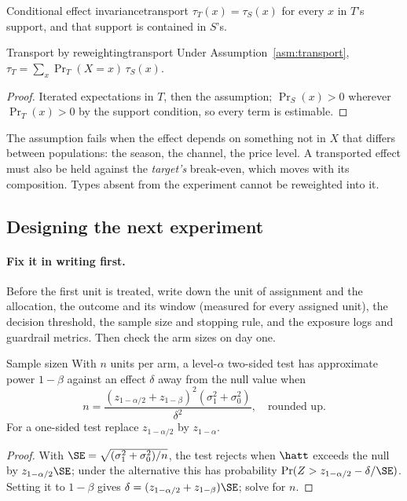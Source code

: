 \documentclass[11pt]{article}
\begin{document}
\begin{assum}{Conditional effect invariance}{transport}
$\tau_T(x) = \tau_S(x)$ for every $x$ in $T$'s support, and that support is contained in $S$'s.
\end{assum}
\begin{prop}{Transport by reweighting}{transport}
Under Assumption~\ref{asm:transport}, $\tau_T = \sum_x \Pr_T(X=x)\,\tau_S(x)$.
\end{prop}
\begin{proof}
Iterated expectations in $T$, then the assumption; $\Pr_S(x) > 0$ wherever $\Pr_T(x) > 0$ by the support
condition, so every term is estimable.
\end{proof}
The assumption fails when the effect depends on something not in $X$ that differs between populations: the
season, the channel, the price level. A transported effect must also be held against the \emph{target's}
break-even, which moves with its composition. Types absent from the experiment cannot be reweighted into it.

\subsection{Designing the next experiment}

\paragraph{Fix it in writing first.} Before the first unit is treated, write down the unit of assignment and
the allocation, the outcome and its window (measured for every assigned unit), the decision threshold, the
sample size and stopping rule, and the exposure logs and guardrail metrics. Then check the arm sizes on day one.

\begin{prop}{Sample size}{n}
With $n$ units per arm, a level-$\alpha$ two-sided test has approximate power $1-\beta$ against an effect
$\delta$ away from the null value when
\[
  n = \frac{(z_{1-\alpha/2} + z_{1-\beta})^2(\sigma_1^2 + \sigma_0^2)}{\delta^2}, \quad\text{rounded up.}
\]
For a one-sided test replace $z_{1-\alpha/2}$ by $z_{1-\alpha}$.
\end{prop}
\begin{proof}
With $\SE = \sqrt{(\sigma_1^2+\sigma_0^2)/n}$, the test rejects when $\hatt$ exceeds the null by
$z_{1-\alpha/2}\SE$; under the alternative this has probability $\Pr(Z > z_{1-\alpha/2} - \delta/\SE)$.
Setting it to $1-\beta$ gives $\delta = (z_{1-\alpha/2} + z_{1-\beta})\SE$; solve for $n$.
\end{proof}
\end{document}
